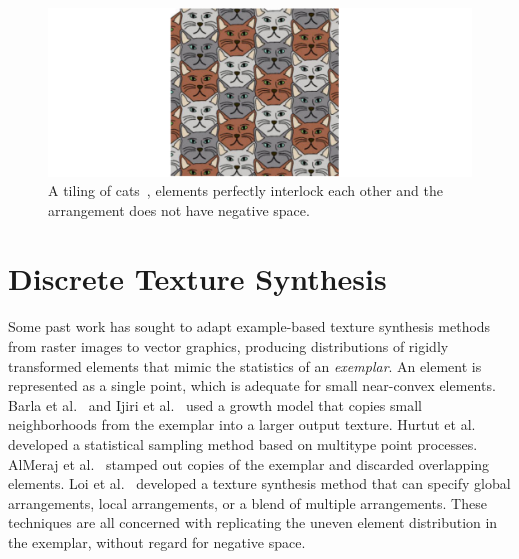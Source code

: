 \begin{figure}[t]
\centering
\includegraphics[width=1.0\textwidth]{figures/related/escherization.pdf} 
\caption[A tiling of cats]
{\label{fig_related_escherization} 
\newtext
{
A tiling of cats~\cite{Kaplan2000}, elements perfectly interlock each other and the arrangement does not have negative space. 
}
}
\end{figure}

\section{Discrete Texture Synthesis}

\newtext
{
Some past work has sought to adapt example-based texture synthesis methods
from raster images to vector graphics, producing distributions of
rigidly transformed elements that mimic the statistics of an \textit{exemplar}.
An element is represented as a single point, which is adequate for small near-convex elements.
Barla et al.~\cite{Barla2006} and Ijiri et al.~\cite{Ijiri2008} used a growth model that copies small neighborhoods
from the exemplar into a larger output texture.  
Hurtut et al.~\cite{Hurtut2009} developed a statistical sampling method based
on multitype point processes.  
AlMeraj et al.~\cite{AlMeraj2013}
stamped out copies of the exemplar and discarded overlapping elements.
Loi et al.~\cite{Loi2017} developed a texture synthesis method that
can specify global arrangements, local arrangements, or a blend of multiple arrangements.
These techniques are all concerned with replicating
the uneven element distribution in the exemplar, without regard for negative space.
}

